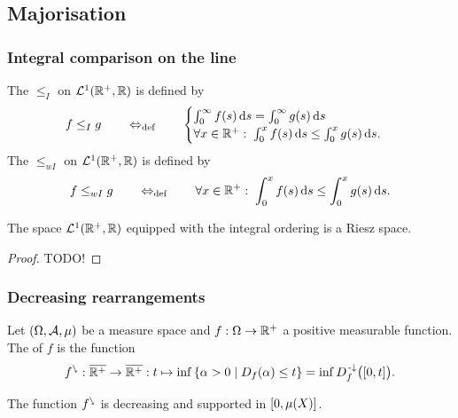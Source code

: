 \subsection{Majorisation}
\subsubsection{Integral comparison on the line}
\begin{definition}
The  $\leq_I$ on $\mathcal{L}^1(\mathbb{R}^+,\mathbb{R})$ is defined by
\[ f \leq_I g \quad \quad\Leftrightarrow_{\text{def}}\quad \quad \begin{cases} 
\int_0^\infty f(s) \operatorname{d \!}{s} = \int_0^\infty g(s) \operatorname{d \!}{s} \\
\forall x\in\mathbb{R}^+: \; \int_0^x f(s) \operatorname{d \!}{s} \leq \int_0^x g(s) \operatorname{d \!}{s}.
\end{cases} \]
The  $\leq_{wI}$ on $\mathcal{L}^1(\mathbb{R}^+,\mathbb{R})$ is defined by
\[ f \leq_{wI} g \quad \quad\Leftrightarrow_{\text{def}}\quad \quad \forall x\in\mathbb{R}^+: \; \int_0^x f(s) \operatorname{d \!}{s} \leq \int_0^x g(s) \operatorname{d \!}{s}. \]
\end{definition}

\begin{proposition}
The space $\mathcal{L}^1(\mathbb{R}^+,\mathbb{R})$ equipped with the integral ordering is a Riesz space.
\end{proposition}
\begin{proof}
TODO!
\end{proof}

\subsubsection{Decreasing rearrangements}
\begin{definition}
Let $\sSet{\Omega, \mathcal{A}, \mu}$ be a measure space and $f: \Omega\to \mathbb{R}^+$ a positive measurable function. The  of $f$ is the function
\[ \decRearrange{f}: \overline{\R^+}\to \overline{\R^+}: t \mapsto \inf\setbuilder{\alpha > 0}{D_f(\alpha)\leq t} = \inf D_f^{\preimf}\big(\interval{0,t}\big).  \]
\end{definition}

The function ${f}^{\ssearrow}$ is decreasing and supported in $\interval[c]{0,\mu(X)}$.



